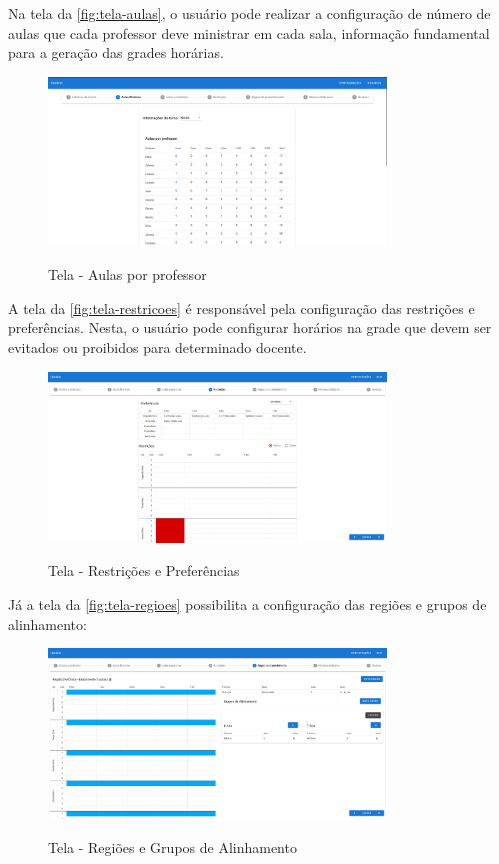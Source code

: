 Na tela da \autoref{fig:tela-aulas}, o usuário pode realizar a configuração de número de aulas que cada professor deve ministrar em cada sala, informação fundamental para a geração das grades horárias.

\begin{figure}[!htb]
	\centering
	\caption{Tela - Aulas por professor}
	\includegraphics[width=0.8\textwidth]{./dados/figuras/tela_aulas}
	\label{fig:tela-aulas}
\end{figure}
\newpage

A tela da \autoref{fig:tela-restricoes} é responsável pela configuração das restrições e preferências. Nesta, o usuário pode configurar horários na grade que devem ser evitados ou proibidos para determinado docente.

\begin{figure}[!htb]
	\centering
	\caption{Tela - Restrições e Preferências}
	\includegraphics[width=0.8\textwidth]{./dados/figuras/restricoes_nova}
	\label{fig:tela-restricoes}
\end{figure}

Já a tela da \autoref{fig:tela-regioes} possibilita a configuração das regiões e grupos de alinhamento:

\begin{figure}[!htb]
	\centering
	\caption{Tela - Regiões e Grupos de Alinhamento}
	\includegraphics[width=0.8\textwidth]{./dados/figuras/tela_regioes}
	\label{fig:tela-regioes}
\end{figure}

